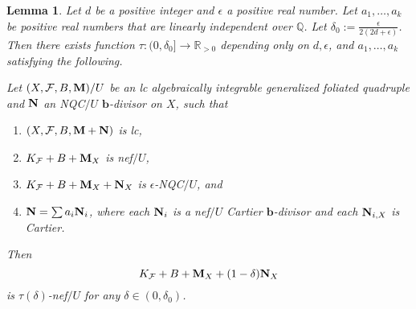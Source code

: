 \documentclass[11pt]{amsart}
\numberwithin{equation}{section}
\newcommand{\bb}{\bm{b}}
\newcommand{\Mm}{{\bf{M}}}
\newcommand{\Nn}{{\bf{N}}}
\newcommand{\Ff}{\mathcal{F}}
\newtheorem{lem}[thm]{Lemma}
\theoremstyle{definition}
\theoremstyle{definition}
\theoremstyle{definition}
\begin{document}
\begin{lem}\label{lem: nqc perturb weak nqc}
    Let $d$ be a positive integer and $\epsilon$ a positive real number. Let $a_1,\dots,a_k$ be positive real numbers that are linearly independent over $\mathbb Q$. Let $\delta_0:=\frac{\epsilon}{2(2d+\epsilon)}$. Then there exists function $\tau: (0,\delta_0]\rightarrow\mathbb R_{>0}$ depending only on $d,\epsilon$, and $a_1,\dots,a_k$ satisfying the following.
    
    Let $(X,\Ff,B,\Mm)/U$ be an lc algebraically integrable generalized foliated quadruple and $\Nn$ an NQC$/U$ $\bb$-divisor on $X$, such that 
    \begin{enumerate}
      \item   $(X,\Ff,B,\Mm+\Nn)$ is lc,
      \item   $K_{\Ff}+B+\Mm_X$ is nef$/U$,
      \item   $K_{\Ff}+B+\Mm_X+\Nn_X$ is $\epsilon$-NQC$/U$, and
      \item $\Nn=\sum a_i\Nn_i$, where each $\Nn_i$ is a nef$/U$ Cartier $\bb$-divisor and each $\Nn_{i,X}$ is Cartier.
    \end{enumerate}
Then $$K_{\Ff}+B+\Mm_X+(1-\delta)\Nn_X$$ is $\tau(\delta)$-nef$/U$ for any $\delta\in (0,\delta_0)$.
\end{lem}
\end{document}
